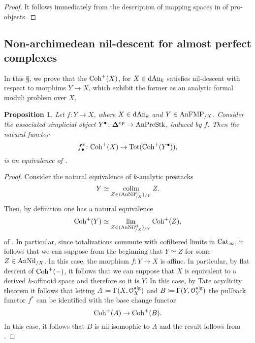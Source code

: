 \documentclass[10pt,a4paper,reqno]{amsart} %
\theoremstyle{plain}
\newtheorem{prop}[thm]{Proposition}
\theoremstyle{definition}
\theoremstyle{remark}
\numberwithin{equation}{section}
\begin{document}
\begin{proof}
    It follows immediately from the description of mapping spaces in \infcats of pro-objects.
\end{proof}


\subsection{Non-archimedean nil-descent for almost perfect complexes}
In this \S, we prove that the \infcat $\mathrm{Coh}^+(X)$, for $X \in \mathrm{dAn}_k$ satisfies nil-descent with respect to morphims $Y \to X$, which exhibit
the former as an analytic formal moduli problem over $X$.

\begin{prop}
    Let $f \colon Y \to X$, where $X \in \mathrm{dAn}_k$ and $Y \in \mathrm{AnFMP}_{/X}$. Consider the associated simplicial object
    $Y^\bullet \colon \mathbf \Delta ^\mathrm{op} \to \mathrm{AnPreStk}$, induced by $f$.
    Then the natural functor
        \[
            f_\bullet^* \colon \mathrm{Coh}^+(X) \to \mathrm{Tot}(\mathrm{Coh}^+(Y^\bullet)),  
        \]
    is an equivalence of \infcats.
\end{prop}

\begin{proof}
    Consider the natural equivalence of $k$-analytic prestacks
        \[
            Y \simeq \operatorname*{colim}_{Z \in (\mathrm{AnNil}^{\mathrm{cl}}_{/X})_{/Y}}  Z.
        \]
    Then, by definition one has a natural equivalence
        \[
            \mathrm{Coh}^+(Y) \simeq \lim_{Z \in (\mathrm{AnNil}^{\mathrm{cl}}_{/X})_{/Y}} \mathrm{Coh}^+(Z),  
        \]
    of \infcats. In particular, since totalizations commute with cofiltered limits in $\mathrm{Cat}_\infty$, it follows that we can suppose from
    the beginning that $Y \simeq Z$ for some $Z \in \mathrm{AnNil}_{/X}$. In this case, the morphism $f \colon Y \to X$ is affine. In particular, by flat descent of
    $\mathrm{Coh}^+(-)$, it follows that we can suppose that $X$ is equivalent to a derived $k$-affinoid space and therefore so it is $Y$. In this case, by Tate acyclicity
    theorem it follows that letting $A \coloneqq \Gamma(X, \mathcal O_X ^\mathrm{alg})$ and $B \coloneqq \Gamma(Y, \mathcal O_Y^\mathrm{alg})$ the pullback functor $f^*$ can be identified with
    the base change functor
        \[
            \mathrm{Coh}^+(A) \to \mathrm{Coh}^+(B).  
        \]
    In this case, it follows that $B$ is nil-isomophic to $A$ and the result follows from \cite[Theorem 3.3.1]{preygel_Leistner_Mapping_stacks_properness}.
\end{proof}
\end{document}
